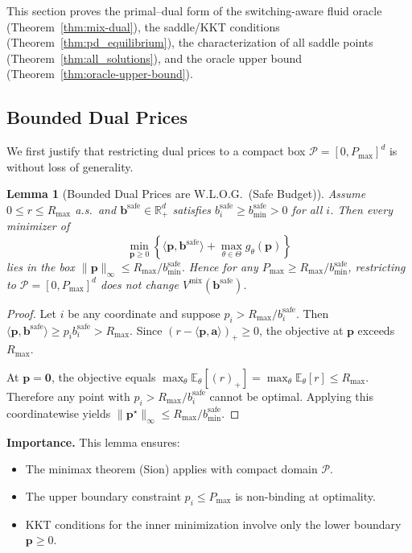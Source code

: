 \documentclass[11pt]{article}
\newtheorem{lemma}[theorem]{Lemma}
\newcommand{\bbS}{\mathbf{b}^{\mathrm{safe}}}
\newcommand{\ba}{\mathbf{a}}
\newcommand{\bp}{\mathbf{p}}
\newcommand{\E}{\mathbb{E}}
\newcommand{\R}{\mathbb{R}}
\newcommand{\cP}{\mathcal{P}}
\begin{document}
This section proves the primal--dual form of the switching-aware fluid oracle (Theorem~\ref{thm:mix-dual}), the saddle/KKT conditions (Theorem~\ref{thm:pd_equilibrium}), the characterization of all saddle points (Theorem~\ref{thm:all_solutions}), and the oracle upper bound (Theorem~\ref{thm:oracle-upper-bound}).

\subsection{Bounded Dual Prices}

We first justify that restricting dual prices to a compact box $\cP = [0, P_{\max}]^d$ is without loss of generality.

\begin{lemma}[Bounded Dual Prices are W.L.O.G.\ (Safe Budget)]
\label{lem:pmax-wlog}
Assume $0 \le r \le R_{\max}$ a.s.\ and $\bbS \in \R_+^d$ satisfies $b^{\mathrm{safe}}_i \ge b^{\mathrm{safe}}_{\min} > 0$ for all $i$. Then every minimizer of
\[
\min_{\bp \ge 0} \left\{ \langle \bp, \bbS \rangle + \max_{\theta \in \Theta} g_\theta(\bp) \right\}
\]
lies in the box $\|\bp\|_\infty \le R_{\max}/b^{\mathrm{safe}}_{\min}$. Hence for any $P_{\max} \ge R_{\max}/b^{\mathrm{safe}}_{\min}$, restricting to $\cP = [0, P_{\max}]^d$ does not change $V^{\mathrm{mix}}(\bbS)$.
\end{lemma}

\begin{proof}
Let $i$ be any coordinate and suppose $p_i > R_{\max}/b^{\mathrm{safe}}_i$. Then $\langle \bp, \bbS \rangle \ge p_i b^{\mathrm{safe}}_i > R_{\max}$. Since $(r - \langle \bp, \ba \rangle)_+ \ge 0$, the objective at $\bp$ exceeds $R_{\max}$.

At $\bp = \mathbf{0}$, the objective equals $\max_\theta \E_\theta[(r)_+] = \max_\theta \E_\theta[r] \le R_{\max}$. Therefore any point with $p_i > R_{\max}/b^{\mathrm{safe}}_i$ cannot be optimal. Applying this coordinatewise yields $\|\bp^\star\|_\infty \le R_{\max}/b^{\mathrm{safe}}_{\min}$.
\end{proof}

\textbf{Importance.} This lemma ensures:
\begin{itemize}
    \item The minimax theorem (Sion) applies with compact domain $\cP$.
    \item The upper boundary constraint $p_i \le P_{\max}$ is non-binding at optimality.
    \item KKT conditions for the inner minimization involve only the lower boundary $\bp \ge 0$.
\end{itemize}
\end{document}
